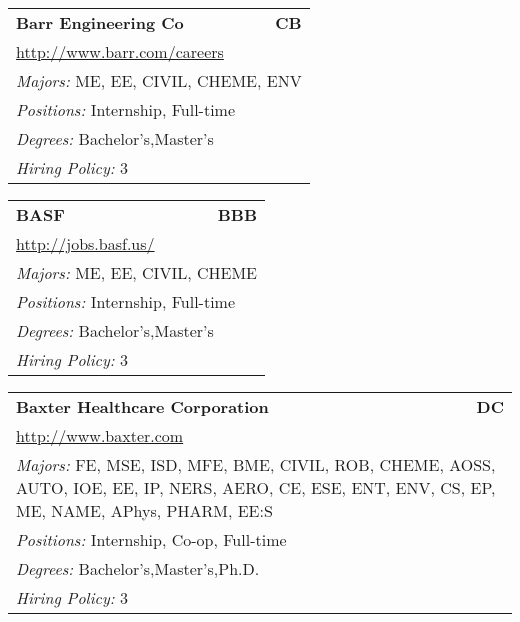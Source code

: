 \documentclass[twoside]{article}
\begin{document}
\begin{center}
\begin{multicols}{3}
\begin{FlushLeft}
\begin{minipage}{\columnwidth}
\end{minipage}
 
\begin{minipage}{\columnwidth}\begin{tabularx}{.95\columnwidth}{Xr}
                 {\Large\bf Barr Engineering Co} & {\Large\bf CB}\\
    \multicolumn{2}{p{.95\columnwidth}}{\url{http://www.barr.com/careers}}\\
    \multicolumn{2}{p{.95\columnwidth}}{\emph{Majors:} ME, EE, CIVIL, CHEME, ENV}\\
    \multicolumn{2}{p{.95\columnwidth}}{\emph{Positions:} Internship, Full-time}\\
    \multicolumn{2}{p{.95\columnwidth}}{\emph{Degrees:} Bachelor's,Master's}\\
    \multicolumn{2}{p{.95\columnwidth}}{\emph{Hiring Policy:} 3}\\
    \end{tabularx}
    
\end{minipage}
 
\begin{minipage}{\columnwidth}\begin{tabularx}{.95\columnwidth}{Xr}
                 {\Large\bf BASF} & {\Large\bf BBB}\\
    \multicolumn{2}{p{.95\columnwidth}}{\url{http://jobs.basf.us/}}\\
    \multicolumn{2}{p{.95\columnwidth}}{\emph{Majors:} ME, EE, CIVIL, CHEME}\\
    \multicolumn{2}{p{.95\columnwidth}}{\emph{Positions:} Internship, Full-time}\\
    \multicolumn{2}{p{.95\columnwidth}}{\emph{Degrees:} Bachelor's,Master's}\\
    \multicolumn{2}{p{.95\columnwidth}}{\emph{Hiring Policy:} 3}\\
    \end{tabularx}
    
\end{minipage}
 
\begin{minipage}{\columnwidth}\begin{tabularx}{.95\columnwidth}{Xr}
                 {\Large\bf Baxter Healthcare Corporation} & {\Large\bf DC}\\
    \multicolumn{2}{p{.95\columnwidth}}{\url{http://www.baxter.com}}\\
    \multicolumn{2}{p{.95\columnwidth}}{\emph{Majors:} FE, MSE, ISD, MFE, BME, CIVIL, ROB, CHEME, AOSS, AUTO, IOE, EE, IP, NERS, AERO, CE, ESE, ENT, ENV, CS, EP, ME, NAME, APhys, PHARM, EE:S}\\
    \multicolumn{2}{p{.95\columnwidth}}{\emph{Positions:} Internship, Co-op, Full-time}\\
    \multicolumn{2}{p{.95\columnwidth}}{\emph{Degrees:} Bachelor's,Master's,Ph.D.}\\
    \multicolumn{2}{p{.95\columnwidth}}{\emph{Hiring Policy:} 3}\\
    \end{tabularx}
    

\end{minipage}
\end{FlushLeft}
\end{multicols}
\end{center}
\end{document}
